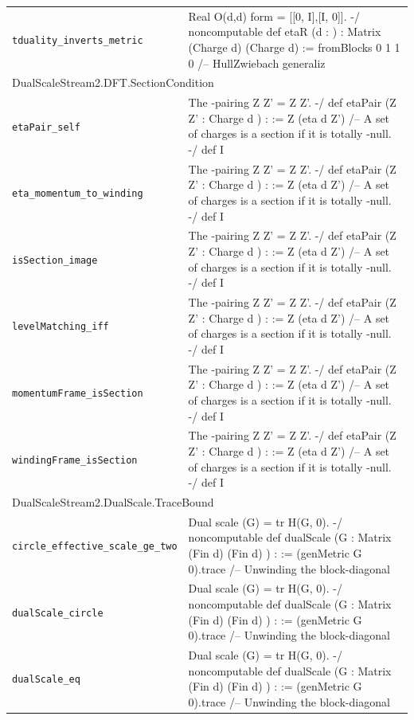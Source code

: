 \begin{longtable}{p{}p{}}
\quad\texttt{\footnotesize tduality\_inverts\_metric} & {\footnotesize Real O(d,d) form  = [[0, I],[I, 0]]. -/ noncomputable def etaR (d : ) : Matrix (Charge d) (Charge d)  := fromBlocks 0 1 1 0 /-- HullZwiebach generaliz} \\
\multicolumn{2}{l}{\textsf{\small DualScaleStream2.DFT.SectionCondition}} \\
\quad\texttt{\footnotesize etaPair\_self} & {\footnotesize The -pairing Z  Z' = Z  Z'. -/ def etaPair (Z Z' : Charge d  ) :  := Z  (eta d  Z') /-- A set of charges is a section if it is totally -null. -/ def I} \\
\quad\texttt{\footnotesize eta\_momentum\_to\_winding} & {\footnotesize The -pairing Z  Z' = Z  Z'. -/ def etaPair (Z Z' : Charge d  ) :  := Z  (eta d  Z') /-- A set of charges is a section if it is totally -null. -/ def I} \\
\quad\texttt{\footnotesize isSection\_image} & {\footnotesize The -pairing Z  Z' = Z  Z'. -/ def etaPair (Z Z' : Charge d  ) :  := Z  (eta d  Z') /-- A set of charges is a section if it is totally -null. -/ def I} \\
\quad\texttt{\footnotesize levelMatching\_iff} & {\footnotesize The -pairing Z  Z' = Z  Z'. -/ def etaPair (Z Z' : Charge d  ) :  := Z  (eta d  Z') /-- A set of charges is a section if it is totally -null. -/ def I} \\
\quad\texttt{\footnotesize momentumFrame\_isSection} & {\footnotesize The -pairing Z  Z' = Z  Z'. -/ def etaPair (Z Z' : Charge d  ) :  := Z  (eta d  Z') /-- A set of charges is a section if it is totally -null. -/ def I} \\
\quad\texttt{\footnotesize windingFrame\_isSection} & {\footnotesize The -pairing Z  Z' = Z  Z'. -/ def etaPair (Z Z' : Charge d  ) :  := Z  (eta d  Z') /-- A set of charges is a section if it is totally -null. -/ def I} \\
\multicolumn{2}{l}{\textsf{\small DualScaleStream2.DualScale.TraceBound}} \\
\quad\texttt{\footnotesize circle\_effective\_scale\_ge\_two} & {\footnotesize Dual scale (G) = tr H(G, 0). -/ noncomputable def dualScale (G : Matrix (Fin d) (Fin d) ) :  := (genMetric G 0).trace /-- Unwinding the block-diagonal} \\
\quad\texttt{\footnotesize dualScale\_circle} & {\footnotesize Dual scale (G) = tr H(G, 0). -/ noncomputable def dualScale (G : Matrix (Fin d) (Fin d) ) :  := (genMetric G 0).trace /-- Unwinding the block-diagonal} \\
\quad\texttt{\footnotesize dualScale\_eq} & {\footnotesize Dual scale (G) = tr H(G, 0). -/ noncomputable def dualScale (G : Matrix (Fin d) (Fin d) ) :  := (genMetric G 0).trace /-- Unwinding the block-diagonal} \\

\end{longtable}

